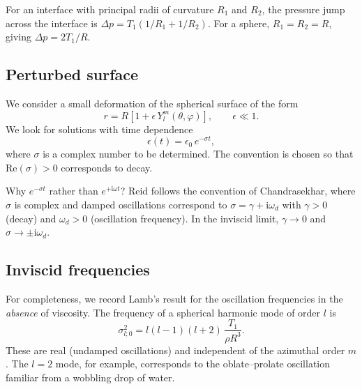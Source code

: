 \documentclass[12pt]{article}
\newcommand{\ii}{\mathrm{i}}
\theoremstyle{definition}
\begin{document}
\begin{notebox}
For an interface with principal radii of curvature $R_1$ and $R_2$, the pressure
jump across the interface is $\Delta p = T_1(1/R_1 + 1/R_2)$. For a sphere,
$R_1 = R_2 = R$, giving $\Delta p = 2T_1/R$.
\end{notebox}

\subsection{Perturbed surface}

We consider a small deformation of the spherical surface of the form
\begin{equation}
  r = R\!\left[1 + \epsilon\,Y_l^m(\theta,\varphi)\right],
  \qquad \epsilon \ll 1.
  \label{eq:surface_deform}
\end{equation}
We look for solutions with time dependence
\begin{equation}
  \epsilon(t) = \epsilon_0\,e^{-\sigma t},
  \label{eq:time_dep}
\end{equation}
where $\sigma$ is a complex number to be determined. The convention is chosen so that
$\mathrm{Re}(\sigma) > 0$ corresponds to decay.

\begin{notebox}
Why $e^{-\sigma t}$ rather than $e^{+\ii\omega t}$? Reid follows the convention of
Chandrasekhar, where $\sigma$ is complex and damped oscillations correspond to
$\sigma = \gamma + \ii\omega_d$ with $\gamma > 0$ (decay) and $\omega_d > 0$
(oscillation frequency). In the inviscid limit, $\gamma\to 0$ and $\sigma\to \pm\ii\omega_d$.
\end{notebox}

\subsection{Inviscid frequencies}

For completeness, we record Lamb's result for the oscillation frequencies in the
\emph{absence} of viscosity. The frequency of a spherical harmonic mode of order $l$ is
\begin{equation}
  \sigma_{l;0}^2 = l(l-1)(l+2)\,\frac{T_1}{\rho R^3}.
  \label{eq:inviscid_freq}
\end{equation}
These are real (undamped oscillations) and independent of the azimuthal order $m$.
The $l=2$ mode, for example, corresponds to the oblate--prolate oscillation familiar
from a wobbling drop of water.
\end{document}
